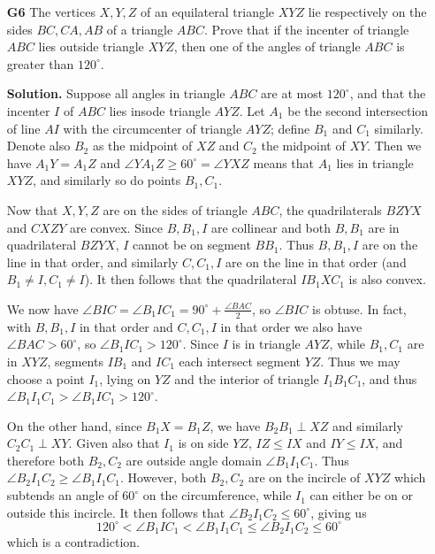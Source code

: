 \documentclass[11pt]{article}
\newcommand{\<}{\langle}
\renewcommand{\>}{\rangle}
\begin{document}
\begin{enumerate}
	\item [\textbf{G6}] 
	The vertices $X, Y , Z$ of an equilateral triangle $XYZ$ lie respectively on the sides $BC, CA, AB$ of a  triangle $ABC.$ 
	Prove that if the incenter of triangle $ABC$ lies outside triangle $XY Z$, 
	then one of the angles of triangle $ABC$ is greater than $120^{\circ}$. 
	
	\textbf{Solution.} 
	Suppose all angles in triangle $ABC$ are at most $120^{\circ}$, 
	and that the incenter $I$ of $ABC$ lies insode triangle $AYZ$. 
	Let $A_1$ be the second intersection of line $AI$ with the circumcenter of triangle $AYZ$; 
	define $B_1$ and $C_1$ similarly. 
	Denote also $B_2$ as the midpoint of $XZ$ and $C_2$ the midpoint of $XY$. 
	Then we have $A_1Y=A_1Z$ and $\angle YA_1Z\ge 60^{\circ} = \angle YXZ$ means that $A_1$ lies in triangle $XYZ$, 
	and similarly so do points $B_1, C_1$. 
	
	Now that $X, Y, Z$ are on the sides of triangle $ABC$, 
	the quadrilaterals $BZYX$ and $CXZY$ are convex. 
	Since $B, B_1, I$ are collinear and both $B, B_1$ are in quadrilateral $BZYX$, 
	$I$ cannot be on segment $BB_1$. 
	Thus $B, B_1, I$ are on the line in that order, and similarly $C, C_1, I$ are on the line in that order (and $B_1\neq I, C_1\neq I$).
	It then follows that the quadrilateral $IB_1XC_1$ is also convex. 
	
	We now have $\angle BIC = \angle B_1IC_1 = 90^{\circ} + \frac{\angle BAC}{2}$, 
	so $\angle BIC$ is obtuse. 
	In fact, with $B, B_1, I$ in that order and $C, C_1, I$ in that order we also have $\angle BAC > 60^{\circ}$, 
	so $\angle B_1IC_1 > 120^{\circ}$. 
	Since $I$ is in triangle $AYZ$, while $B_1, C_1$ are in $XYZ$, segments $IB_1$ and $IC_1$ each intersect segment $YZ$. 
	Thus we may choose a point $I_1$, lying on $YZ$ and the interior of triangle $I_1B_1C_1$, 
	and thus $\angle B_1I_1C_1 > \angle B_1IC_1 > 120^{\circ}$. 
	
	On the other hand, since $B_1X=B_1Z$, 
	we have $B_2B_1\perp XZ$ and similarly $C_2C_1\perp XY$. 
	Given also that $I_1$ is on side $YZ$, 
	$IZ\le IX$ and $IY\le IX$, 
	and therefore both $B_2, C_2$ are outside angle domain $\angle B_1I_1C_1$. 
	Thus $\angle B_2I_1C_2 \ge \angle B_1I_1C_1$. 
	However, both $B_2, C_2$ are on the incircle of $XYZ$ which subtends an angle of $60^{\circ}$ on the circumference, 
	while $I_1$ can either be on or outside this incircle. 
	It then follows that $\angle B_2I_1C_2 \le 60^{\circ}$, giving us 
	\begin{equation}
		120^{\circ} < \angle B_1IC_1 < \angle B_1I_1C_1 \le \angle B_2I_1C_2 \le 60^{\circ}
	\end{equation}
    which is a contradiction. 
	

\end{enumerate}
\end{document}
